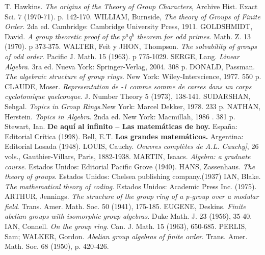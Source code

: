 \begin{thebibliography}{99}
     T. Hawkins. \textit{The origins of the Theory of Group Characters}, Archive Hist. Exact Sci. $7$ (1970-71). p. 142-170.
     WILLIAM, Burnside, \textit{The theory of Groups of Finite Order}. 	2da ed. Cambridge: Cambridge University Press, 1911.
      GOLDSHMIDT, David. \textit{A group theoretic proof of the $p^aq^b$ theorem for odd primes}. Math. Z. 13 (1970). p 373-375.
     WALTER, Feit y JHON, Thompson. \textit{The solvability of groups of odd order}. Pacific J. Math. 15 (1963). p 775-1029.
    SERGE, Lang. \textit{Linear Algebra}. 3ra ed. Nueva York: Springer-Verlag, 2004. 308 p.
     DONALD, Passman. \textit{The algebraic structure of group rings}. New York: Wiley-Interscience, 1977. 550 p.
     CLAUDE, Moser. \textit{Representation de -1 comme somme de carres dans un corps cyclotomique quelconque}. J. Number Theory 5 (1973), 138-141.
     SUDARSHAN, Sehgal.  \textit{Topics in Group Rings}.New York: Marcel Dekker, 1978. 233 p. 
     NATHAN, Herstein. \textit{Topics in Algebra}. 2nda ed.  New York: Macmillah, 1986 . 381 p. 
     Stewart, Ian. \textbf{De aquí al infinito -- Las matemáticas de hoy.} España: Editorial Crítica (1998).
     Bell, E.T. \textbf{Los grandes matemáticos.} Argentina: Editorial Losada (1948).
     LOUIS, Cauchy. \textit{Oeuvres complètes de A.L. Cauchy]}, 26 vols., Gauthier-Villars, Paris, 1882-1938.
	MARTIN, Isaacs. \textit{Algebra: a graduate course}. Estados Unidos: Editorial Pacific Grove (1940).
	 HANS, Zassenhaus. \textit{The theory of groups}. Estados Unidos: Chelsea publishing company.(1937)
	 IAN, Blake. \textit{The mathematical theory of coding}. Estados Unidos: Academic Press Inc. (1975).
	 ARTHUR, Jennings. \textit{The structure of the group ring of a p-group over a modular field}. Trans. Amer. Math. Soc. 50 (1941), 175-185.
	EUGENE, Deskins. \textit{Finite abelian groups with isomorphic group algebras}. Duke Math. J. 23 (1956), 35-40.
	 IAN, Connell. \textit{On the group ring}. Can. J. Math. 15 (1963), 650-685.
	 PERLIS, Sam; WALKER, Gordon. \textit{Abelian group algebras of finite order}. Trans. Amer. Math. Soc. 68 (1950), p. 420-426.
\end{thebibliography}
